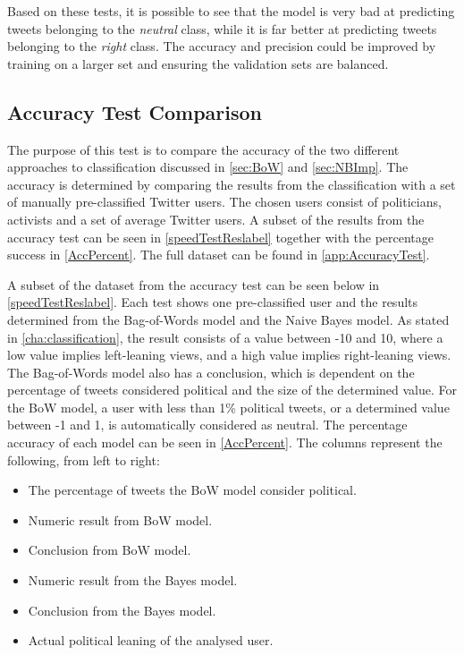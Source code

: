 Based on these tests, it is possible to see that the model is very bad at
predicting tweets belonging to the \textit{neutral} class, while it is far
better at predicting tweets belonging to the \textit{right} class. The accuracy
and precision could be improved by training on a larger set and ensuring the
validation sets are balanced.

\subsection{Accuracy Test Comparison}
The purpose of this test is to compare the accuracy of the two different
approaches to classification discussed in \autoref{sec:BoW} and
\autoref{sec:NBImp}. The accuracy is determined by comparing the results
from the classification with a set of manually pre-classified Twitter users.
The chosen users consist of politicians, activists and a set of average
Twitter users. A subset of the results from the accuracy test can be seen in
\autoref{speedTestReslabel} together with the percentage success in
\autoref{AccPercent}. The full dataset can be found in
\autoref{app:AccuracyTest}.\nl

A subset of the dataset from the accuracy test can be seen below in
\autoref{speedTestReslabel}. Each test shows one pre-classified user and the
results determined from the Bag-of-Words model and the Naive Bayes model. As
stated in \autoref{cha:classification}, the result consists of a value between
-10 and 10, where a low value implies left-leaning views, and a high value
implies right-leaning views. The Bag-of-Words model also has a conclusion, which is dependent on the
percentage of tweets considered political and the size of the determined value.
For the BoW model, a user with less than 1\% political tweets, or a determined
value between -1 and 1, is automatically considered as neutral. The percentage
accuracy of each model can be seen in \autoref{AccPercent}. The columns
represent the following, from left to right:\nl

\begin{itemize}
  \item The percentage of tweets the BoW model
consider political.
\item Numeric result from BoW model.
\item Conclusion from BoW model.
\item Numeric result from the Bayes model.
\item Conclusion from the Bayes model.
\item Actual political leaning of the analysed user.
\end{itemize}


